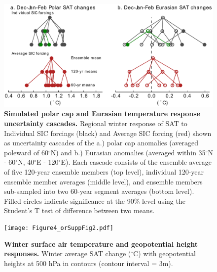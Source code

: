\documentclass{nature}
\begin{document}
\begin{figure}%
\centering
\noindent\includegraphics[width=35pc]{Figure3.pdf}
\caption{\textbf{Simulated polar cap and Eurasian temperature response uncertainty cascades.} Regional winter response of SAT to Individual SIC forcings (black) and Average SIC forcing (red) shown as uncertainty cascades of the a.) polar cap anomalies (averaged poleward of 60$^\circ$N) and b.) Eurasian anomalies (averaged within 35$^\circ$N - 60$^\circ$N, 40$^\circ$E - 120$^\circ$E). Each cascade consists of the ensemble average of five 120-year ensemble members (top level), individual 120-year ensemble member averages (middle level), and ensemble members sub-sampled into two 60-year segment averages (bottom level). Filled circles indicate significance at the 90\% level using the Student’s T test of difference between two means. 
}
\label{fig:fig3} 
\end{figure}

\begin{figure}%
\centering
\noindent\texttt{[image: Figure4\_orSuppFig2.pdf]}
\caption{\textbf{Winter surface air temperature and geopotential height responses.} Winter average SAT change ($^\circ$C) with geopotential heights at 500 hPa in contours (contour interval = 3m).
}
\label{fig:fig4} 
\end{figure}
\end{document}
